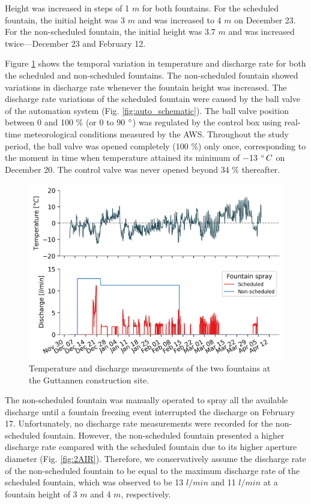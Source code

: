 \documentclass[tc, manuscript]{copernicus}
\begin{document}
Height was increased in steps of 1 $m$ for both fountains. For the scheduled fountain, the initial height was 3
$m$ and was increased to 4 $m$ on December 23. For the non-scheduled fountain, the initial height was 3.7 $m$ and
was increased twice---December 23 and February 12.

Figure \ref{fig:aws} shows the temporal variation in temperature and discharge rate for both the scheduled and
non-scheduled fountains. The non-scheduled fountain showed variations in discharge rate whenever the fountain height
was increased. The discharge rate variations of the scheduled fountain were caused by the ball valve of the
automation system (Fig. \ref{fig:auto_schematic}). The ball valve position between 0 and 100 \% (or 0 to 90
$^{\circ}$) was regulated by the control box using real-time meteorological conditions measured by the AWS.
Throughout the study period, the ball valve was opened completely (100 \%) only once, corresponding to the
moment in time when temperature attained its minimum of $-$13 $^{\circ} \, C$ on December 20. The control valve
was never opened beyond 34 \% thereafter.  

\begin{figure}
\includegraphics[width=12cm]{Figures/disvstemp.png}
\caption{Temperature and discharge measurements of the two fountains at the Guttannen construction site.}
\label{fig:aws} 
\end{figure}

The non-scheduled fountain was manually operated to spray all the available discharge until a fountain freezing
event interrupted the discharge on February 17. Unfortunately, no discharge rate measurements were recorded for
the non-scheduled fountain. However, the non-scheduled fountain presented a higher discharge rate compared with the
scheduled fountain due to its higher aperture diameter (Fig. \ref{fig:2AIR}). Therefore, we conservatively assume
the discharge rate of the non-scheduled fountain to be equal to the maximum discharge rate of the scheduled
fountain, which was observed to be 13 $l/min$ and 11 $l/min$ at a fountain height of 3 $m$ and 4 $m$,
respectively.
\end{document}
